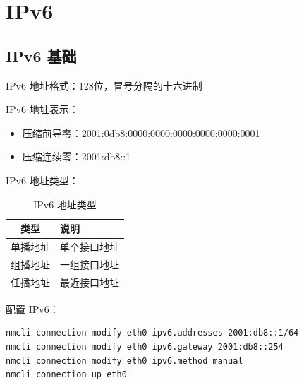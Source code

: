 \documentclass[12pt,UTF8]{ctexbook}
\begin{document}
\chapter{IPv6}
\label{chap:ipv6}

\section{IPv6 基础}
\label{sec:ipv6_basics}

IPv6 地址格式：128位，冒号分隔的十六进制

IPv6 地址表示：
\begin{itemize}
    \item 压缩前导零：2001:0db8:0000:0000:0000:0000:0000:0001
    \item 压缩连续零：2001:db8::1
\end{itemize}

IPv6 地址类型：
\begin{table}[htbp]
    \centering
    \caption{IPv6 地址类型}
    \begin{tabular}{|c|p{8cm}|}
        \hline
        \textbf{类型} & \textbf{说明} \\
        \hline
        单播地址 & 单个接口地址 \\
        \hline
        组播地址 & 一组接口地址 \\
        \hline
        任播地址 & 最近接口地址 \\
        \hline
    \end{tabular}
\end{table}

配置 IPv6：
\begin{verbatim}
nmcli connection modify eth0 ipv6.addresses 2001:db8::1/64
nmcli connection modify eth0 ipv6.gateway 2001:db8::254
nmcli connection modify eth0 ipv6.method manual
nmcli connection up eth0
\end{verbatim}

\backmatter
\end{document}
